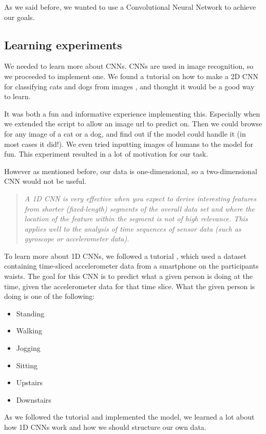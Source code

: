 As we said before, we wanted to use a Convolutional Neural Network to achieve our goals. 

\subsection{Learning experiments}

We needed to learn more about CNNs. CNNs are used in image recognition, so we proceeded to implement one. We found a tutorial on how to make 
a 2D CNN for classifying cats and dogs from images \cite{2d_cnn}, and thought it would be a good way to learn.

It was both a fun and informative experience implementing this. Especially when we extended the script to allow an image url to predict on. 
Then we could browse for any image of a cat or a dog, and find out if the model could handle it (in most cases it did!). 
We even tried inputting images of humans to the model for fun. This experiment resulted in a lot of motivation for our task.

However as mentioned before, our data is one-dimensional, so a two-dimensional CNN would not be useful.

\begin{quote}
  \textit{A 1D CNN is very effective when you expect to derive interesting features from shorter (fixed-length) segments of the overall data set 
  and where the location of the feature within the segment is not of high relevance. This applies well to the analysis of time sequences of sensor data 
  (such as gyroscope or accelerometer data).} \cite{1d_cnn}
\end{quote}

To learn more about 1D CNNs, we followed a tutorial \cite{1d_cnn}, which used a dataset containing 
time-sliced accelerometer data from a smartphone on the participants waists. The goal for this CNN is to predict what a given person is doing 
at the time, given the accelerometer data for that time slice. What the given person is doing is one of the following:
\begin{itemize}
  \item Standing
  \item Walking
  \item Jogging
  \item Sitting
  \item Upstairs
  \item Downstairs
\end{itemize}

As we followed the tutorial and implemented the model, we learned a lot about how 1D CNNs work and how we should structure our own data. 

